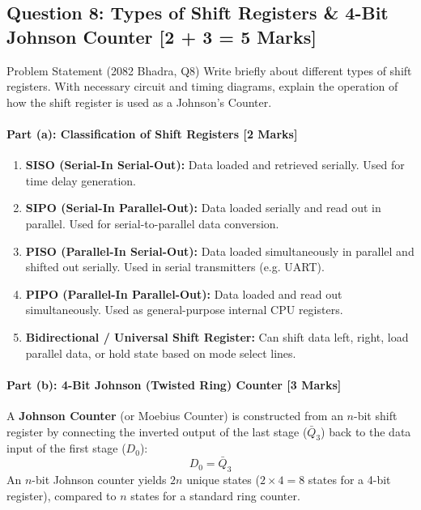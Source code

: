 \documentclass[11pt,a4paper,oneside]{book}
\begin{document}
\subsection{Question 8: Types of Shift Registers \& 4-Bit Johnson Counter [2 + 3 = 5 Marks]}
\begin{questionbox}{Problem Statement (2082 Bhadra, Q8)}
Write briefly about different types of shift registers. With necessary circuit and timing diagrams, explain the operation of how the shift register is used as a Johnson's Counter.
\end{questionbox}

\paragraph{Part (a): Classification of Shift Registers [2 Marks]}
\begin{enumerate}
  \item \textbf{SISO (Serial-In Serial-Out):} Data loaded and retrieved serially. Used for time delay generation.
  \item \textbf{SIPO (Serial-In Parallel-Out):} Data loaded serially and read out in parallel. Used for serial-to-parallel data conversion.
  \item \textbf{PISO (Parallel-In Serial-Out):} Data loaded simultaneously in parallel and shifted out serially. Used in serial transmitters (e.g. UART).
  \item \textbf{PIPO (Parallel-In Parallel-Out):} Data loaded and read out simultaneously. Used as general-purpose internal CPU registers.
  \item \textbf{Bidirectional / Universal Shift Register:} Can shift data left, right, load parallel data, or hold state based on mode select lines.
\end{enumerate}

\paragraph{Part (b): 4-Bit Johnson (Twisted Ring) Counter [3 Marks]}
A \textbf{Johnson Counter} (or Moebius Counter) is constructed from an $n$-bit shift register by connecting the inverted output of the last stage ($\bar{Q}_3$) back to the data input of the first stage ($D_0$):
\[
D_0 = \bar{Q}_3
\]
An $n$-bit Johnson counter yields $2n$ unique states ($2 \times 4 = 8$ states for a 4-bit register), compared to $n$ states for a standard ring counter.
\end{document}
